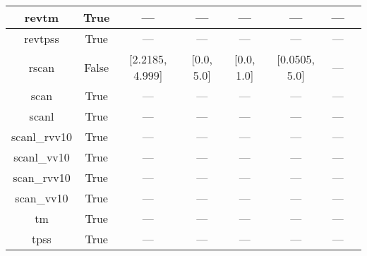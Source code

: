 \begin{tabular}{|c|c|c|c|c|c|c|l|}
        revtm &                  True &              --- &              --- &           --- &            --- &        --- &                                                               \cite{Jana2019_6356} \\ \hline
      revtpss &                  True &              --- &              --- &           --- &            --- &        --- &                                     \cite{Perdew2009_026403,Perdew2009_026403_err} \\ \hline
        rscan &                 False &  [2.2185, 4.999] &       [0.0, 5.0] &    [0.0, 1.0] &  [0.0505, 5.0] &        --- &                                                           \cite{Bartok2019_161101} \\ \hline
         scan &                  True &              --- &              --- &           --- &            --- &        --- &                                                              \cite{Sun2015_036402} \\ \hline
        scanl &                  True &              --- &              --- &           --- &            --- &        --- &                            \cite{Mejia2017_052512,Mejia2018_115161,Sun2015_036402} \\ \hline
 scanl\_rvv10 &                  True &              --- &              --- &           --- &            --- &        --- &                           \cite{Mejia2017_052512,Mejia2018_115161,Peng2016_041005} \\ \hline
  scanl\_vv10 &                  True &              --- &              --- &           --- &            --- &        --- &                    \cite{Mejia2017_052512,Mejia2018_115161,Brandenburg2016_115144} \\ \hline
  scan\_rvv10 &                  True &              --- &              --- &           --- &            --- &        --- &                                                             \cite{Peng2016_041005} \\ \hline
   scan\_vv10 &                  True &              --- &              --- &           --- &            --- &        --- &                                                      \cite{Brandenburg2016_115144} \\ \hline
           tm &                  True &              --- &              --- &           --- &            --- &        --- &                                                              \cite{Tao2016_073001} \\ \hline
         tpss &                  True &              --- &              --- &           --- &            --- &        --- &                                              \cite{Tao2003_146401,Perdew2004_6898} \\ \hline

\end{tabular}
